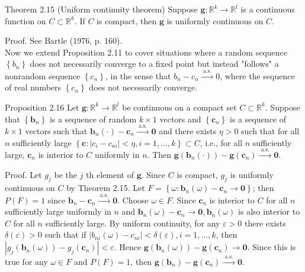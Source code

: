 \documentclass[10pt]{article}
\begin{document}
Theorem 2.15 (Uniform continuity theorem) Suppose $\mathbf{g}: \mathbb{R}^{k} \rightarrow \mathbb{R}^{l}$ is a continuous function on $C \subset \mathbb{R}^{k}$. If $C$ is compact, then $\mathbf{g}$ is uniformly continuous on $C$.

Proof. See Bartle (1976, p. 160).\\
Now we extend Proposition 2.11 to cover situations where a random sequence $\left\{b_{n}\right\}$ does not necessarily converge to a fixed point but instead "follows" a nonrandom sequence $\left\{c_{n}\right\}$, in the sense that $b_{n}-c_{n} \xrightarrow{\text { a.s. }} 0$, where the sequence of real numbers $\left\{c_{n}\right\}$ does not necessarily converge.

Proposition 2.16 Let $\mathbf{g}: \mathbb{R}^{k} \rightarrow \mathbb{R}^{l}$ be continuous on a compact set $C \subset \mathbb{R}^{k}$. Suppose that $\left\{\mathbf{b}_{n}\right\}$ is a sequence of random $k \times 1$ vectors and $\left\{\mathbf{c}_{n}\right\}$ is a sequence of $k \times 1$ vectors such that $\mathbf{b}_{n}(\cdot)-\mathbf{c}_{n} \xrightarrow{\text { a.s. }} \mathbf{0}$ and there exists $\eta>0$ such that for all $n$ sufficiently large $\left\{\mathbf{c}:\left|c_{i}-c_{n i}\right|<\eta, i=1, \ldots, k\right\} \subset C$, i.e., for all $n$ sufficiently large, $\mathbf{c}_{n}$ is interior to $C$ uniformly in $n$. Then $\mathbf{g}\left(\mathbf{b}_{n}(\cdot)\right)-\mathbf{g}\left(\mathbf{c}_{n}\right) \xrightarrow{\text { a.s. }} \mathbf{0}$.

Proof. Let $g_{j}$ be the $j$ th element of $\mathbf{g}$. Since $C$ is compact, $g_{j}$ is uniformly continuous on $C$ by Theorem 2.15. Let $F=\left\{\omega: \mathbf{b}_{n}(\omega)-\mathbf{c}_{n} \rightarrow \mathbf{0}\right\}$; then $P(F)=1$ since $\mathbf{b}_{n}-\mathbf{c}_{n} \xrightarrow{\text { a.s. }} \mathbf{0}$. Choose $\omega \in F$. Since $\mathbf{c}_{n}$ is interior to $C$ for all $n$ sufficiently large uniformly in $n$ and $\mathbf{b}_{n}(\omega)-\mathbf{c}_{n} \rightarrow \mathbf{0}, \mathbf{b}_{n}(\omega)$ is also interior to $C$ for all $n$ sufficiently large. By uniform continuity, for any $\varepsilon>0$ there exists $\delta(\varepsilon)>0$ such that if $\left|b_{n i}(\omega)-c_{n i}\right|<\delta(\varepsilon), i=1, \ldots, k$, then $\left|g_{j}\left(\mathbf{b}_{n}(\omega)\right)-g_{j}\left(\mathbf{c}_{n}\right)\right|<\varepsilon$. Hence $\mathbf{g}\left(\mathbf{b}_{n}(\omega)\right)-\mathbf{g}\left(\mathbf{c}_{n}\right) \rightarrow \mathbf{0}$. Since this is true for any $\omega \in F$ and $P(F)=1$, then $\mathbf{g}\left(\mathbf{b}_{n}\right)-\mathbf{g}\left(\mathbf{c}_{n}\right) \xrightarrow{\text { a.s. }} \mathbf{0}$.
\end{document}
